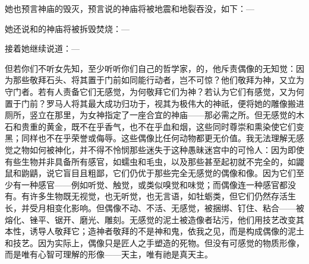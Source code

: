 \par

她也预言神庙的毁灭，预言说的神庙将被地震和地裂吞没，如下：—\par

\par

她还说和的神庙将被拆毁焚烧：—\par

\par

接着她继续说道：—\par

\par

但若你们不听女先知，至少听听你们自己的哲学家，的，他斥责偶像的无知觉：因为那些敬拜石头、将其置于门前如同能行动者，岂不可惊？他们敬拜为神，又立为守门者。若有人责备它们无感觉，为何敬拜它们为神？若认为它们有感觉，又为何置于门前？罗马人将其最大成功归功于，视其为极伟大的神祇，便将她的雕像搬进厕所，竖立在那里，为女神指定了一座合宜的神庙——那必需之所。但无感觉的木石和贵重的黄金，既不在乎香气，也不在乎血和烟，这些同时尊崇和熏染使它们变黑；同样也不在乎荣誉或侮辱。这些偶像比任何动物都更无价值。我无法理解无感觉之物如何被神化，并不得不怜悯那些迷失于这种愚昧迷宫中的可怜人：因为即使有些生物并非具备所有感官，如蠕虫和毛虫，以及那些甚至起初就不完全的，如鼹鼠和鼩鼱，说它盲目且粗鄙，它们仍优于那些完全无感觉的偶像和像。因为它们至少有一种感官——例如听觉、触觉，或类似嗅觉和味觉；而偶像连一种感官都没有。有许多生物既无视觉，也无听觉，也无言语，如牡蛎类，但它们仍然存活生长，并受月相变化影响。但偶像不动、不活、无感觉，被捆绑、钉住、粘合——被熔化、锉平、锯开、磨光、雕刻。无感觉的泥土被造像者玷污，他们用技艺改变其本性，诱导人敬拜它；造神者敬拜的不是神和鬼，依我之见，而是构成偶像的泥土和技艺。因为实际上，偶像只是匠人之手塑造的死物。但没有可感觉的物质形像，而是唯有心智可理解的形像——天主，唯有祂是真天主。\par

